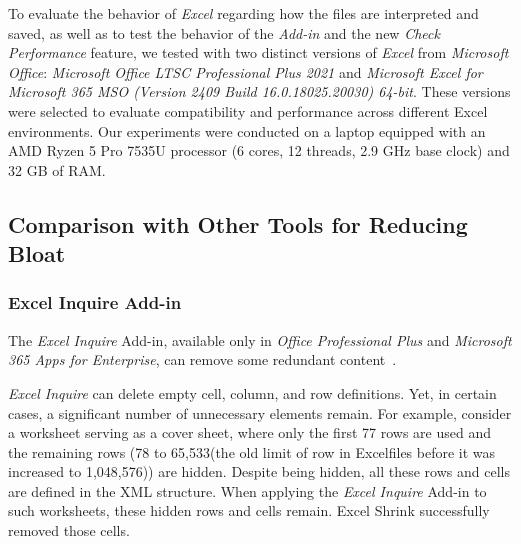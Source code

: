 \documentclass[conference]{IEEEtran}
\begin{document}
To evaluate the behavior of \textit{Excel} regarding how the files are interpreted and saved, as well as to test the behavior of the \textit{Add-in} and the new \textit{Check Performance} feature, we tested with two distinct versions of \textit{Excel} from \textit{Microsoft Office}: \textit{Microsoft Office LTSC Professional Plus 2021} and \textit{Microsoft Excel for Microsoft 365 MSO (Version 2409 Build 16.0.18025.20030) 64-bit}. These versions were selected to evaluate compatibility and performance across different Excel environments. Our experiments were conducted on a laptop equipped with an AMD Ryzen 5 Pro 7535U processor (6 cores, 12 threads, 2.9 GHz base clock) and 32 GB of RAM.

\subsection{Comparison with Other Tools for Reducing Bloat}






\subsubsection{Excel Inquire Add-in}

The \textit{Excel Inquire} Add-in, available only in \textit{Office Professional Plus} and \textit{Microsoft 365 Apps for Enterprise}, can remove some redundant content~\cite{o2014excel}.

\textit{Excel Inquire} can delete empty cell, column, and row definitions. Yet, in certain cases, a significant number of unnecessary elements remain. For example, consider a worksheet serving as a cover sheet, where only the first 77 rows are used and the remaining rows (78 to 65,533(the old limit of row in Excelfiles before it was increased to 1,048,576)) are hidden. Despite being hidden, all these rows and cells are defined in the XML structure.
When applying the \textit{Excel Inquire} Add-in to such worksheets, these hidden rows and cells remain. Excel Shrink successfully removed those cells.
\end{document}
